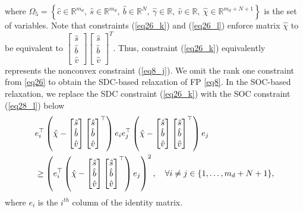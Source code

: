 \documentclass[smallextended,referee,envcountsect,,numbers]{svjour3}
\begin{document}
\noindent where $\Omega_5 = \left\{ \hat{c} \in \mathbb{R}^{m_d},~\hat{s} \in \mathbb{R}^{m_d},~\hat{b} \in \mathbb{R}^N,~\hat{\gamma} \in \mathbb{R},~\hat{v} \in \mathbb{R},~\hat{\chi} \in \mathbb{R}^{m_d+N+1} \right\}$ is the set of variables. Note that constraints (\ref{eq26_k}) and (\ref{eq26_l}) enforce matrix $\hat{\chi}$ to be equivalent to $\left[ \begin{matrix}			\hat{s}\\\hat{b}\\\hat{v}\end{matrix}
			\right]\left[ \begin{matrix}			\hat{s}\\\hat{b}\\\hat{v}\end{matrix}
			\right]^T$. Thus, constraint (\ref{eq26_k}) equivalently represents the nonconvex constraint (\ref{eq8_j}). We omit the rank one constraint from \eqref{eq26} to obtain the SDC-based relaxation of FP \eqref{eq8}. In the SOC-based relaxation, we replace the SDC constraint (\ref{eq26_k}) with the SOC constraint (\ref{eq28_l}) below 
\begin{align}\label{eq28_l}
&e_i^\top \left( \hat{\chi} - \begin{bmatrix} \hat{s} \\ \hat{b} \\ \hat{v} \end{bmatrix} \begin{bmatrix} \hat{s} \\ \hat{b} \\ \hat{v} \end{bmatrix}^\top \right) e_i e_j^\top \left( \hat{\chi} - \begin{bmatrix} \hat{s} \\ \hat{b} \\ \hat{v} \end{bmatrix} \begin{bmatrix} \hat{s} \\ \hat{b} \\ \hat{v} \end{bmatrix}^\top \right) e_j \notag \\ 
&\ge \left( e_i^\top \left( \hat{\chi} - \begin{bmatrix} \hat{s} \\ \hat{b} \\ \hat{v} \end{bmatrix} \begin{bmatrix} \hat{s} \\ \hat{b} \\ \hat{v} \end{bmatrix}^\top \right) e_j \right)^2,\quad \forall i \ne j \in \{1,\dots,m_d+N+1\},
\end{align} 
\noindent where $e_i$ is the $i^{th}$ column of the identity matrix. 
\end{document}
